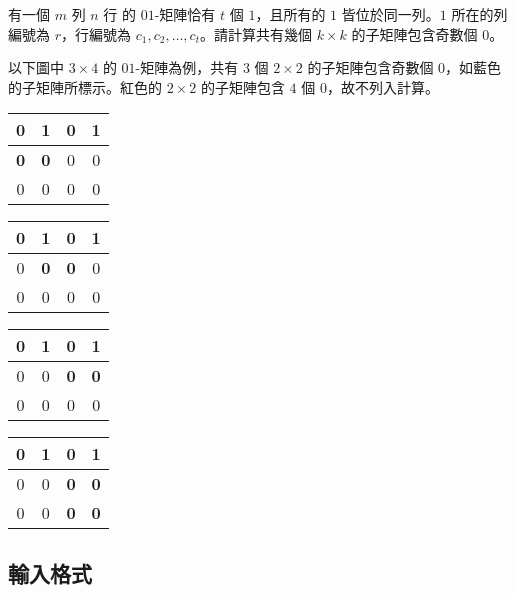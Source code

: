 有一個 \(m\) 列 \(n\) 行 的 \(01\)-矩陣恰有 \(t\) 個 \(1\)，且所有的
\(1\) 皆位於同一列。\(1\) 所在的列編號為 \(r\)，行編號為
\(c_1, c_2, \ldots, c_t\)。請計算共有幾個 \(k\times k\)
的子矩陣包含奇數個 \(0\)。

以下圖中 \(3\times 4\) 的 \(01\)-矩陣為例，共有 \(3\) 個 \(2\times 2\)
的子矩陣包含奇數個 \(0\)，如藍色的子矩陣所標示。紅色的 \(2\times 2\)
的子矩陣包含 \(4\) 個 \(0\)，故不列入計算。

\begin{center}
\begin{tabular}{|c|c|c|c|} \hline
\cellcolor{blue!20}\textbf{0} & \cellcolor{blue!20}\textbf{1} & 0 & 1 \\ \hline
\cellcolor{blue!20}\textbf{0} & \cellcolor{blue!20}\textbf{0} & 0 & 0 \\ \hline
0 & 0 & 0 & 0 \\ \hline
\end{tabular}
\quad
\begin{tabular}{|c|c|c|c|} \hline
0 & \cellcolor{blue!20}\textbf{1} & \cellcolor{blue!20}\textbf{0} & 1 \\ \hline
0 & \cellcolor{blue!20}\textbf{0} & \cellcolor{blue!20}\textbf{0} & 0 \\ \hline
0 & 0 & 0 & 0 \\ \hline
\end{tabular}
\quad
\begin{tabular}{|c|c|c|c|} \hline
0 & 1 & \cellcolor{blue!20}\textbf{0} & \cellcolor{blue!20}\textbf{1} \\ \hline
0 & 0 & \cellcolor{blue!20}\textbf{0} & \cellcolor{blue!20}\textbf{0} \\ \hline
0 & 0 & 0 & 0 \\ \hline
\end{tabular}

\begin{tabular}{|c|c|c|c|} \hline
0 & 1 & 0 & 1 \\ \hline
0 & 0 & \cellcolor{red!20}\textbf{0} & \cellcolor{red!20}\textbf{0} \\ \hline
0 & 0 & \cellcolor{red!20}\textbf{0} & \cellcolor{red!20}\textbf{0} \\ \hline
\end{tabular}
\end{center}

\subsection{輸入格式}

